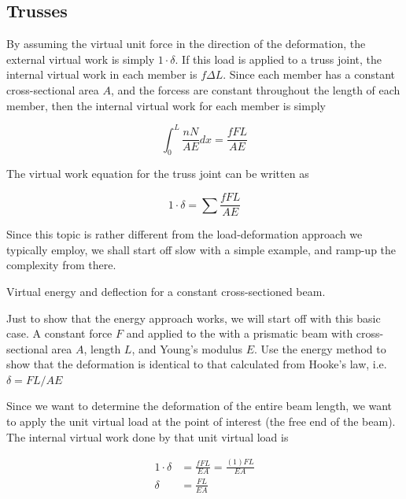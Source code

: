 \documentclass[
fontsize=10pt,
a4paper,
twosides=false,
open=any,
svgnames,
]{kaobook} %
\begin{document}
\subsection{Trusses}

By assuming the virtual unit force in the direction of the deformation, the external virtual work is simply $1 \cdot \delta$. If this load is applied to a truss joint, the internal virtual work in each member is $f \Delta L$. Since each member has a constant cross-sectional area $A$, and the forcess are constant throughout the length of each member, then the internal virtual work for each member is simply

\begin{equation*}
  \int_0^L \frac{nN}{AE} dx = \frac{fFL}{AE}
\end{equation*}

The virtual work equation for the truss joint can be written as

\begin{equation}
  1 \cdot \delta = \sum \frac{fFL}{AE}
\end{equation}

Since this topic is rather different from the load-deformation approach we typically employ, we shall start off slow with a simple example, and ramp-up the complexity from there.

\begin{example} Virtual energy and deflection for a constant cross-sectioned beam.

  Just to show that the energy approach works, we will start off with this basic case. A constant force $F$ and applied to the with a prismatic beam with cross-sectional area $A$, length $L$, and Young's modulus $E$. Use the energy method to show that the deformation is identical to that calculated from Hooke's law, i.e. $\delta = FL/AE$

  \centering

  Since we want to determine the deformation of the entire beam length, we want to apply the unit virtual load at the point of interest (the free end of the beam). The internal virtual work done by that unit virtual load is

  \begin{align*}
    1 \cdot \delta &= \frac{fFL}{EA} = \frac{(1)FL}{EA} \\
    \delta &= \frac{FL}{EA} 
  \end{align*}
\end{example}
\end{document}
